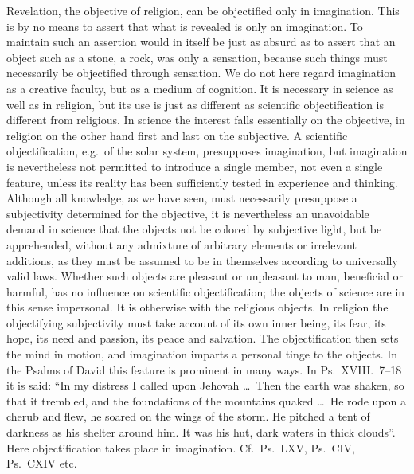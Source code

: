 \documentclass[12pt,a4paper]{article}
\newcommand{\opage}[1]{\marginnote{\footnotesize\textit{[#1]}}}
\begin{document}
\opage{9}Revelation, the objective of religion, can be objectified
only in imagination. This is by no means to assert that what is
revealed is only an imagination. To maintain such an assertion would
in itself be just as absurd as to assert that an object such as a
stone, a rock, was only a sensation, because such things must
necessarily be objectified through sensation. We do not here regard
imagination as a creative faculty, but as a medium of cognition. It is
necessary in science as well as in religion, but its use is just as
different as scientific objectification is different from religious.
In science the interest falls essentially on the objective, in religion
on the other hand first and last on the subjective. A scientific
objectification, e.g.\ of the solar system, presupposes imagination,
but imagination is nevertheless not permitted to introduce a single
member, not even a single feature, unless its reality has been
sufficiently tested in experience and thinking. Although all knowledge,
as we have seen, must necessarily presuppose a subjectivity determined
for the objective,
it is nevertheless an unavoidable demand in science that the objects
not be colored by subjective light, but be apprehended, without any
admixture of arbitrary elements or irrelevant additions, as they must
be assumed to be in themselves according to universally valid laws.
Whether such objects are pleasant or unpleasant to man, beneficial or
harmful, has no influence on scientific objectification; the objects of
science are in this sense impersonal. It is otherwise with the
religious objects. In religion the objectifying subjectivity must take
account of its own inner being,
its fear, its hope, its need and passion, its peace and salvation. The
objectification then sets the mind in motion, and imagination imparts
a personal tinge to the objects. In the Psalms of David this feature is
prominent in many ways. In Ps.\ XVIII.\ 7--18 it is said: ``In my
distress I called upon Jehovah \ldots\ Then the earth was shaken, so
that it trembled, and the foundations of the mountains quaked \ldots\
He rode upon a cherub and flew, he soared on the wings of the storm. He
pitched a tent of darkness as his shelter
\opage{10}around him. It was his hut, dark waters in thick clouds''.
Here objectification takes place in imagination. Cf.\ Ps.\ LXV,
Ps.\ CIV, Ps.\ CXIV etc.
\end{document}
